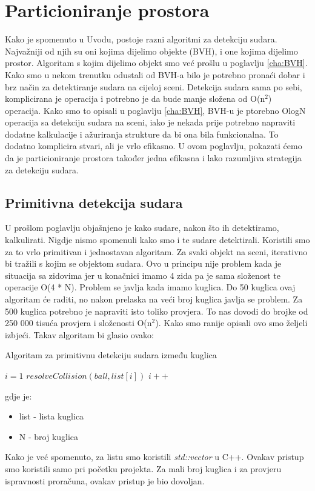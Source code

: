 \chapter{Particioniranje prostora}
Kako je spomenuto u Uvodu, postoje razni algoritmi za detekciju sudara. Najvažniji od njih su oni kojima dijelimo objekte (BVH), i one kojima dijelimo prostor. Algoritam s kojim dijelimo objekt smo već prošlu u poglavlju \ref{cha:BVH}. Kako smo u nekom trenutku odustali od BVH-a bilo je potrebno pronaći dobar i brz način za detektiranje sudara na cijeloj sceni. Detekcija sudara sama po sebi, komplicirana je operacija i potrebno je da bude manje složena od O(n\texttt{$^2$}) operacija. Kako smo to opisali u poglavlju \ref{cha:BVH}, BVH-u je ptorebno O{logN} operacija sa detekciju sudara na sceni, iako je nekada prije potrebno napraviti dodatne kalkulacije i ažuriranja strukture da bi ona bila funkcionalna. To dodatno komplicira stvari, ali je vrlo efikasno. U ovom poglavlju, pokazati ćemo da je particioniranje prostora također jedna efikasna i lako razumljiva strategija za detekciju sudara.

\section{Primitivna detekcija sudara}
U prošlom poglavlju objašnjeno je kako sudare, nakon što ih detektiramo, kalkulirati. Nigdje nismo spomenuli kako smo i te sudare detektirali. Koristili smo za to vrlo primitivan i jednostavan algoritam. Za svaki objekt na sceni, iterativno bi tražili s kojim se objektom sudara. Ovo u principu nije problem kada je situacija sa zidovima jer u konačnici imamo 4 zida pa je sama složenost te operacije O(4 * N). Problem se javlja kada imamo kuglica. Do 50 kuglica ovaj algoritam će raditi, no nakon prelaska na veći broj kuglica javlja se problem. Za 500 kuglica potrebno je napraviti isto toliko provjera. To nas dovodi do brojke od 250 000 tisuća provjera i složenosti O(n\texttt{$^2$}). Kako smo ranije opisali ovo smo željeli izbjeći. Takav algoritam bi glasio ovako:
\begin{algorithm}
	\caption{Algoritam za primitivnu detekciju sudara između kuglica}
	\label{alg:primitive_collision}
	\begin{algorithmic}
		\State $i = 1$
		\State $resolveCollision(ball,list[i])$
		\EndIf
		\State $i++$
		\EndWhile
		\EndFor
		\EndFunction
	\end{algorithmic}
\end{algorithm}
gdje je:
\begin{itemize}
	\item list - lista kuglica
	\item N - broj kuglica
\end{itemize}
Kako je već spomenuto, za listu smo koristili \emph{std::vector} u C++. Ovakav pristup smo koristili samo pri početku projekta. Za mali broj kuglica i za provjeru ispravnosti proračuna, ovakav pristup je bio dovoljan. \newpage
